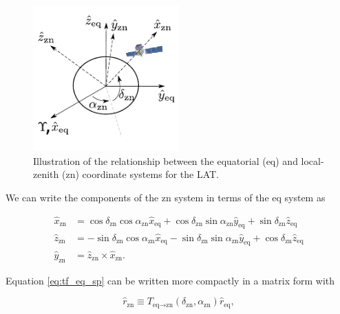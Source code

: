 \begin{figure}[h!]
    \centering
    \includegraphics[width=0.5\textwidth]{content/methodology/figures/fig_coordinate/coord_eq_sp_v3.pdf}
    \caption{
        Illustration of the relationship between the equatorial (eq)
        and local-zenith (zn) coordinate systems for the LAT.
    }
    \label{fig:coord_eq_sp}
\end{figure}


We can write the components of the zn system in terms of the eq system as

\begin{equation}
    \begin{split}
    \hat{x}_\text{zn} &= \cos\delta_\text{zn}\cos\alpha_\text{zn}\hat{x}_\text{eq} + \cos\delta_\text{zn}\sin\alpha_\text{zn}\hat{y}_\text{eq} + \sin\delta_\text{zn}\hat{z}_\text{eq}\\
    \hat{z}_\text{zn} &= - \sin\delta_\text{zn}\cos\alpha_\text{zn}\hat{x}_\text{eq} - \sin\delta_\text{zn}\sin\alpha_\text{zn}\hat{y}_\text{eq} + \cos\delta_\text{zn}\hat{z}_\text{eq} \\
    \hat{y}_\text{zn} &= \hat{z}_\text{zn} \times \hat{x}_\text{zn}.
    \end{split}
    \label{eq:tf_eq_sp}
\end{equation}

Equation \ref{eq:tf_eq_sp} can be written more
compactly in a matrix form with

\begin{equation}
    \hat{r}_\text{zn} \equiv T_{\text{eq}\rightarrow\text{zn}} (\delta_\text{zn}, \alpha_\text{zn}) \hat{r}_\text{eq},
    \label{eq:rep_tf_eq_sp}
\end{equation}

